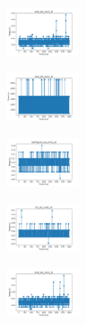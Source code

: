 \begin{figure}[H]
\begin{subfigure}
    \end{subfigure}
    \hfill
    \begin{subfigure}
        \centering
        \includegraphics[width=0.234\textwidth]{img/aggsf/ecoli_set_const_10_589741062_time.png}
    \end{subfigure}
    \hfill
    \begin{subfigure}
        \centering
        \includegraphics[width=0.234\textwidth]{img/aggsf/rand_set_const_10_589741062_time.png}
    \end{subfigure}
    \hfill
    \begin{subfigure}
        \centering
        \includegraphics[width=0.234\textwidth]{img/aggsf/newthyroid_set_const_10_589741062_time.png}
    \end{subfigure}
    \hfill
    \begin{subfigure}
        \centering
        \includegraphics[width=0.234\textwidth]{img/aggsf/iris_set_const_10_277451237_time.png}
    \end{subfigure}
    \hfill
    \begin{subfigure}
        \centering
        \includegraphics[width=0.234\textwidth]{img/aggsf/ecoli_set_const_10_277451237_time.png}
    \end{subfigure}
    \hfill

\end{figure}
